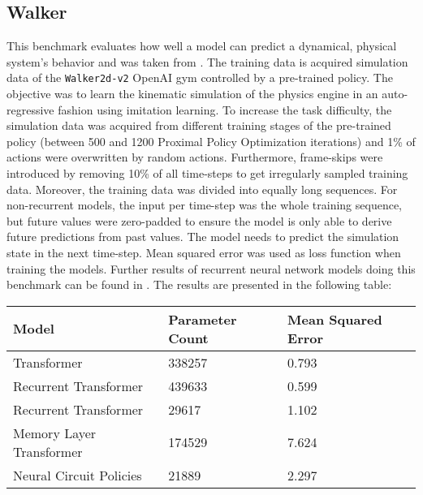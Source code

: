 \documentclass[draft,final]{vutinfth} %
\begin{document}
\subsection{Walker}
This benchmark evaluates how well a model can predict a dynamical, physical system's behavior and was taken from \cite{LongTermDependenciesIrregularTimeSeries}.
The training data is acquired simulation data of the \texttt{Walker2d-v2} OpenAI gym \cite{OpenAIGym} controlled by a pre-trained policy.
The objective was to learn the kinematic simulation of the physics engine in an auto-regressive fashion using imitation learning.
To increase the task difficulty, the simulation data was acquired from different training stages of the pre-trained policy (between 500 and 1200 Proximal Policy Optimization iterations) and 1\% of actions were overwritten by random actions.
Furthermore, frame-skips were introduced by removing 10\% of all time-steps to get irregularly sampled training data. 
Moreover, the training data was divided into equally long sequences.
For non-recurrent models, the input per time-step was the whole training sequence, but future values were zero-padded to ensure the model is only able to derive future predictions from past values.
The model needs to predict the simulation state in the next time-step.
Mean squared error was used as loss function when training the models.
Further results of recurrent neural network models doing this benchmark can be found in \cite{LatentODEsIrregularlySampled}.
The results are presented in the following table:
\begin{table}[h]
\begin{tabular}{lll}
\hline
Model & Parameter Count & Mean Squared Error \\ \hline
Transformer & 338257 & 0.793 \\ 
Recurrent Transformer & 439633 & 0.599 \\ 
Recurrent Transformer & 29617 & 1.102 \\ 
Memory Layer Transformer & 174529 & 7.624 \\ 
Neural Circuit Policies & 21889 & 2.297 \\
\end{tabular}
\end{table}
\end{document}
